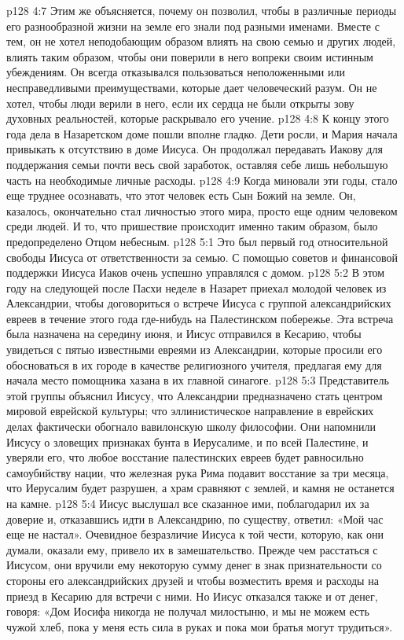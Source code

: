 \vs p128 4:7 Этим же объясняется, почему он позволил, чтобы в различные периоды его разнообразной жизни на земле его знали под разными именами. Вместе с тем, он не хотел неподобающим образом влиять на свою семью и других людей, влиять таким образом, чтобы они поверили в него вопреки своим истинным убеждениям. Он всегда отказывался пользоваться неположенными или несправедливыми преимуществами, которые дает человеческий разум. Он не хотел, чтобы люди верили в него, если их сердца не были открыты зову духовных реальностей, которые раскрывало его учение.
\vs p128 4:8 \pc К концу этого года дела в Назаретском доме пошли вполне гладко. Дети росли, и Мария начала привыкать к отсутствию в доме Иисуса. Он продолжал передавать Иакову для поддержания семьи почти весь свой заработок, оставляя себе лишь небольшую часть на необходимые личные расходы.
\vs p128 4:9 Когда миновали эти годы, стало еще труднее осознавать, что этот человек есть Сын Божий на земле. Он, казалось, окончательно стал личностью этого мира, просто еще одним человеком среди людей. И то, что пришествие происходит именно таким образом, было предопределено Отцом небесным.
\vs p128 5:1 Это был первый год относительной свободы Иисуса от ответственности за семью. С помощью советов и финансовой поддержки Иисуса Иаков очень успешно управлялся с домом.
\vs p128 5:2 \pc В этом году на следующей после Пасхи неделе в Назарет приехал молодой человек из Александрии, чтобы договориться о встрече Иисуса с группой александрийских евреев в течение этого года где\hyp{}нибудь на Палестинском побережье. Эта встреча была назначена на середину июня, и Иисус отправился в Кесарию, чтобы увидеться с пятью известными евреями из Александрии, которые просили его обосноваться в их городе в качестве религиозного учителя, предлагая ему для начала место помощника хазана в их главной синагоге.
\vs p128 5:3 Представитель этой группы объяснил Иисусу, что Александрии предназначено стать центром мировой еврейской культуры; что эллинистическое направление в еврейских делах фактически обогнало вавилонскую школу философии. Они напомнили Иисусу о зловещих признаках бунта в Иерусалиме, и по всей Палестине, и уверяли его, что любое восстание палестинских евреев будет равносильно самоубийству нации, что железная рука Рима подавит восстание за три месяца, что Иерусалим будет разрушен, а храм сравняют с землей, и камня не останется на камне.
\vs p128 5:4 Иисус выслушал все сказанное ими, поблагодарил их за доверие и, отказавшись идти в Александрию, по существу, ответил: «Мой час еще не настал». Очевидное безразличие Иисуса к той чести, которую, как они думали, оказали ему, привело их в замешательство. Прежде чем расстаться с Иисусом, они вручили ему некоторую сумму денег в знак признательности со стороны его александрийских друзей и чтобы возместить время и расходы на приезд в Кесарию для встречи с ними. Но Иисус отказался также и от денег, говоря: «Дом Иосифа никогда не получал милостыню, и мы не можем есть чужой хлеб, пока у меня есть сила в руках и пока мои братья могут трудиться».
